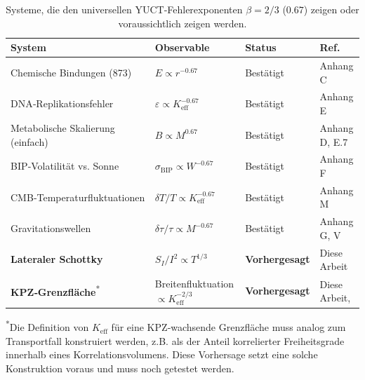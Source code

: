 \documentclass[12pt,a4paper]{article}
\newcommand{\Keff}{K_{\mathrm{eff}}}
\begin{document}
	\begin{table}[H]
		\centering
		\caption{Systeme, die den universellen YUCT‑Fehlerexponenten $\beta = 2/3$ ($0.67$)
			zeigen oder voraussichtlich zeigen werden.}
		\label{tab:universal-beta}
		\begin{tabular}{@{}llll@{}}
			\toprule
			\textbf{System} & \textbf{Observable} & \textbf{Status} & \textbf{Ref.}\\
			\midrule
			Chemische Bindungen (873)      & $E \propto r^{-0.67}$               & Bestätigt  & Anhang C \\
			DNA‑Replikationsfehler    & $\varepsilon \propto \Keff^{-0.67}$ & Bestätigt  & Anhang E \\
			Metabolische Skalierung (einfach)& $B \propto M^{0.67}$               & Bestätigt  & Anhang D, E.7 \\
			BIP‑Volatilität vs. Sonne   & $\sigma_{\mathrm{BIP}} \propto W^{-0.67}$ & Bestätigt & Anhang F \\
			CMB‑Temperaturfluktuationen    & $\delta T/T \propto \Keff^{-0.67}$ & Bestätigt  & Anhang M \\
			Gravitationswellen       & $\delta\tau/\tau \propto M^{-0.67}$& Bestätigt  & Anhang G, V \\
			\textbf{Lateraler Schottky} & $S_I/I^2 \propto T^{1/3}$          & \textbf{Vorhergesagt} & Diese Arbeit \\
			\textbf{KPZ‑Grenzfläche}\textsuperscript{*} & Breitenfluktuation $\propto \Keff^{-2/3}$& \textbf{Vorhergesagt} & Diese Arbeit, \cite{KPZ}\\
			\bottomrule
		\end{tabular}
		
		\vspace{0.3cm}
		{\footnotesize \textsuperscript{*}Die Definition von $K_{\mathrm{eff}}$ für eine KPZ‑wachsende Grenzfläche muss analog zum Transportfall konstruiert werden, z.B. als der Anteil korrelierter Freiheitsgrade innerhalb eines Korrelationsvolumens. Diese Vorhersage setzt eine solche Konstruktion voraus und muss noch getestet werden.}
	\end{table}
	
\end{document}
